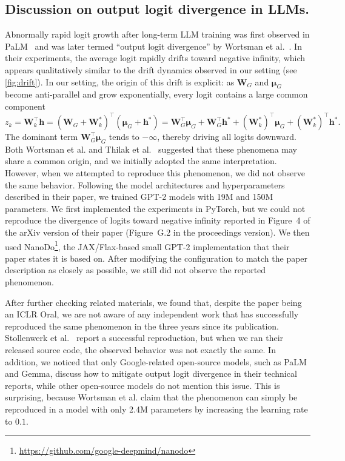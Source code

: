 \documentclass{article}
\theoremstyle{plain}
\theoremstyle{definition}
\theoremstyle{remark}
\begin{document}
\subsection{Discussion on output logit divergence in LLMs.}
\label{app:llm}
Abnormally rapid logit growth after long-term LLM training was first observed in PaLM~\cite{chowdhery2023} 
and was later termed ``output logit divergence'' by Wortsman et al.~\cite{wortsman2024}. 
In their experiments, the average logit rapidly drifts toward negative infinity, 
which appears qualitatively similar to the drift dynamics observed in our setting (see \cref{fig:drift}). 
In our setting, the origin of this drift is explicit: as $\bm{W}_G$ and $\bm{\mu}_G$ become anti-parallel and grow exponentially, every logit contains a large common component
\begin{equation}
z_k = \bm{W}_k^\top \bm{h} = (\bm{W}_G + \bm{W}_k^*)^\top(\bm{\mu}_G + \bm{h}^*) 
= \bm{W}_G^\top \bm{\mu}_G + \bm{W}_G^\top \bm{h}^* + (\bm{W}_k^*)^\top \bm{\mu}_G + (\bm{W}_k^*)^\top \bm{h}^* .
\end{equation}
The dominant term $\bm{W}_G^\top \bm{\mu}_G$ tends to $-\infty$, thereby driving all logits downward.
Both Wortsman et al. and Thilak et al.~\cite{thilak2024} suggested that these phenomena may share a common origin, 
and we initially adopted the same interpretation. 
However, when we attempted to reproduce this phenomenon, we did not observe the same behavior. 
Following the model architectures and hyperparameters described in their paper, 
we trained GPT-2 models with 19M and 150M parameters. We first implemented the experiments in PyTorch, 
but we could not reproduce the divergence of logits toward negative infinity reported in 
Figure~4 of the arXiv version of their paper (Figure~G.2 in the proceedings version). 
We then used NanoDo\footnote{\url{https://github.com/google-deepmind/nanodo}}, 
the JAX/Flax-based small GPT-2 implementation that their paper states it is based on. 
After modifying the configuration to match the paper description as closely as possible, 
we still did not observe the reported phenomenon.

After further checking related materials, we found that, despite the paper being an ICLR Oral, 
we are not aware of any independent work that has successfully reproduced the same phenomenon in the three years since its publication. 
Stollenwerk et al.~\cite{stollenwerk2026} report a successful reproduction, 
but when we ran their released source code, the observed behavior was not exactly the same. 
In addition, we noticed that only Google-related open-source models, such as PaLM and Gemma, 
discuss how to mitigate output logit divergence in their technical reports, while other open-source models do not mention this issue. 
This is surprising, because Wortsman et al. claim that the phenomenon can simply be reproduced in 
a model with only 2.4M parameters by increasing the learning rate to $0.1$.
\end{document}
